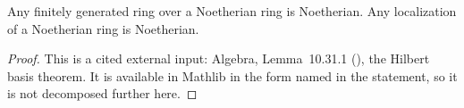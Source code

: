 \begin{lemma}
\label{lem:pcb-fg-algebra-noetherian}
Any finitely generated ring over a Noetherian ring is Noetherian.  Any
localization of a Noetherian ring is Noetherian.
\mathlibok\ 
\end{lemma}
\begin{proof}
This is a cited external input: Algebra, Lemma~10.31.1
(), the Hilbert basis theorem.  It is available in
Mathlib in the form named in the statement, so it is not decomposed
further here.
\end{proof}


